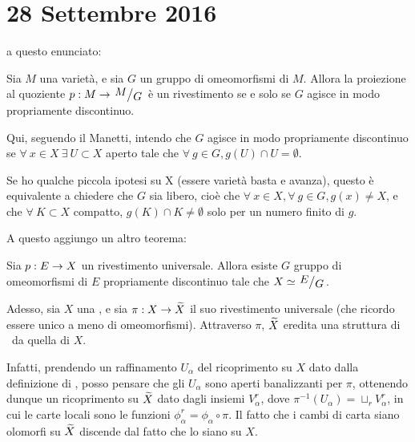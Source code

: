 \chapter{28 Settembre 2016}
\justify

 a questo enunciato:
\begin{teorema}
	Sia $M$ una varietà, e sia $G$ un gruppo di omeomorfismi di $M$.
 	Allora la proiezione al quoziente $p:M\rar \quotient{M}{G}$ è un rivestimento se e solo se $G$ agisce in modo propriamente discontinuo.
\end{teorema}

Qui, seguendo il Manetti, intendo che $G$ agisce in modo propriamente discontinuo se $\forall\ x\in X\ \exists\ U\subset X$ aperto tale che $\forall\ g\in G, g(U)\cap U=\emptyset$. 

Se ho qualche piccola ipotesi su X (essere varietà basta e avanza), questo è equivalente a chiedere che $G$ sia libero, cioè che $\forall\ x \in X, \forall\ g\in G, g(x)\neq X$, e che $\forall\ K \subset X$ compatto, $g(K)\cap K \neq \emptyset$ solo per un numero finito di $g$.

A questo aggiungo un altro teorema:

\begin{teorema} \label{rivuniv}
 	Sia $p:E\rightarrow X$ un rivestimento universale. Allora esiste $G$ gruppo di omeomorfismi di $E$ propriamente discontinuo tale che $X\isom\quotient{E}{G}$.
\end{teorema}

Adesso, sia $X$ una \sdR, e sia $\pi:X\rightarrow\widetilde{X}$ il suo rivestimento universale (che ricordo essere unico a meno di omeomorfismi). Attraverso $\pi$, $\widetilde{X}$ eredita una struttura di \sdR\ da quella di $X$.

Infatti, prendendo un raffinamento $U_\alpha$ del ricoprimento su $X$ dato dalla definizione di \sdR, posso pensare che gli $U_\alpha$ sono aperti banalizzanti per $\pi$, ottenendo dunque un ricoprimento su $\widetilde{X}$ dato dagli insiemi $V_\alpha^r$, dove $\pi^{-1}(U_\alpha)=\sqcup_r V_\alpha^r$, in cui le carte locali sono le funzioni $\phi_\alpha^r=\phi_\alpha\circ\pi$. Il fatto che i cambi di carta siano olomorfi su $\widetilde{X}$ discende dal fatto che lo siano su $X$.

